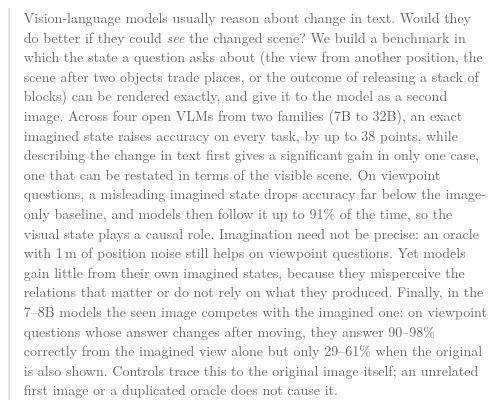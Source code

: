 \begin{abstract}
Vision-language models usually reason about change in text. Would they do better if they could \emph{see} the changed scene? We build a benchmark in which the state a question asks about (the view from another position, the scene after two objects trade places, or the outcome of releasing a stack of blocks) can be rendered exactly, and give it to the model as a second image. Across four open VLMs from two families (7B to 32B), an exact imagined state raises accuracy on every task, by up to 38 points, while describing the change in text first gives a significant gain in only one case, one that can be restated in terms of the visible scene. On viewpoint questions, a misleading imagined state drops accuracy far below the image-only baseline, and models then follow it up to 91\% of the time, so the visual state plays a causal role. Imagination need not be precise: an oracle with 1\,m of position noise still helps on viewpoint questions. Yet models gain little from their own imagined states, because they misperceive the relations that matter or do not rely on what they produced. Finally, in the 7--8B models the seen image competes with the imagined one: on viewpoint questions whose answer changes after moving, they answer 90--98\% correctly from the imagined view alone but only 29--61\% when the original is also shown. Controls trace this to the original image itself; an unrelated first image or a duplicated oracle does not cause it.
\end{abstract}
